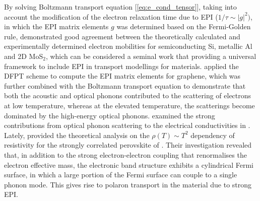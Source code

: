 By solving Boltzmann transport equation [\cref{eq:e_cond_tensor}], taking into account the modification of the electron relaxation time due to EPI ($1/\tau\sim |g|^2)$, in which the EPI matrix elements $g$ was determined based on the Fermi-Golden rule, \citet{li2015electrical} demonstrated good agreement between the theoretically calculated and experimentally determined electron mobilities for semiconducting Si, metallic Al and 2D MoS$_2$, which can be considered a seminal work that providing a universal framework to include EPI in transport modellings for materials.  \citet{borysenko2010first} applied the DFPT scheme to compute the EPI matrix elements for graphene, which was further combined with the Boltzmann transport equation to demonstrate that both the acoustic and optical phonons contributed to the scattering of electrons at low temperature, whereas at the elevated temperature, the scatterings become dominated by the high-energy optical phonons. \citet{himmetoglu2014first} examined the strong contributions from optical phonon scattering to the electrical conductivities in . Lately, \citet{mirjolet2021electron} provided the theoretical analysis on the $\rho(T)\sim  T^2$ dependency of resistivity for the strongly correlated perovskite of . Their investigation revealed that, in addition to the strong electron-electron coupling that renormalises the electron effective mass, the electronic band structure exhibits a cylindrical Fermi surface, in which a large portion of the Fermi surface can couple to a single phonon mode. This gives rise to polaron transport in the material due to strong EPI. 

